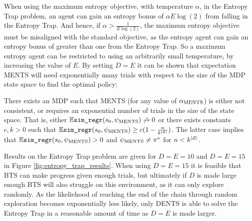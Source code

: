         When using the maximum entropy objective, with temperature $\alpha$, in the Entropy Trap problem, an agent can gain an entropy bonus of $\alpha E \log(2)$ from falling in the Entropy Trap. And hence, if $\alpha > \frac{1}{E\log(2)}$, the maximum entropy objective must be misaligned with the standard objective, as the entropy agent can gain an entropy bonus of greater than one from the Entropy Trap. So a maximum entropy agent can be restricted to using an arbitrarily small temperature, by increasing the value of $E$. By setting $D=E$ it can be shown that expectation MENTS will need exponentially many trials with respect to the size of the MDP state space to find the optimal policy: 
        \begin{theorem} \label{thrm:ments_fail}
            There exists an MDP such that MENTS (for any value of ${\alpha_{{\textnormal{MENTS}}}}$) is either not consistent, or requires an exponential number of trials in the size of the state space. That is, either $\mathbb{E}{\textnormal{\texttt{sim\_regr}}}(s_0,\psi_{{\textnormal{MENTS}}})\not\rightarrow 0$ or there exists constants $c,k>0$ such that $\mathbb{E}{\textnormal{\texttt{sim\_regr}}}(s_0,\psi_{{\textnormal{MENTS}}}) \geq c(1 - \frac{n}{k^{|\mathcal{S}|}})$. The latter case implies that $\mathbb{E}{\textnormal{\texttt{sim\_regr}}}(s_0,\psi_{{\textnormal{MENTS}}})>0$ and $\psi_{{\textnormal{MENTS}}}\neq\pi^*$ for $n<k^{|\mathcal{S}|}$. 
        \end{theorem}

        Results on the Entropy Trap problem are given for $D=E=10$ and $D=E=15$ in Figure \ref{fig:entropy_trap_results}. When using $D=E=15$ it is feasible that BTS can make progress given enough trials, but ultimately if $D$ is made large enough BTS will also struggle on this environment, as it can only explore randomly. As the likeliehood of reaching the end of the chain through random exploration becomes exponentially less likely, only DENTS is able to solve the Entropy Trap in a reasonable amount of time as $D=E$ is made larger.

